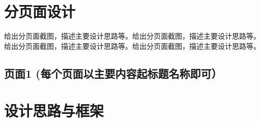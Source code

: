 \documentclass[supercite]{Experimental_Report}
\theoremstyle{definition}
\begin{document}
\newpage

\section{分页面设计}

给出分页面截图，描述主要设计思路等。给出分页面截图，描述主要设计思路等。给出分页面截图，描述主要设计思路等。给出分页面截图，描述主要设计思路等。

\subsection{页面1 (每个页面以主要内容起标题名称即可）}

\section*{设计思路与框架}
\end{document}
